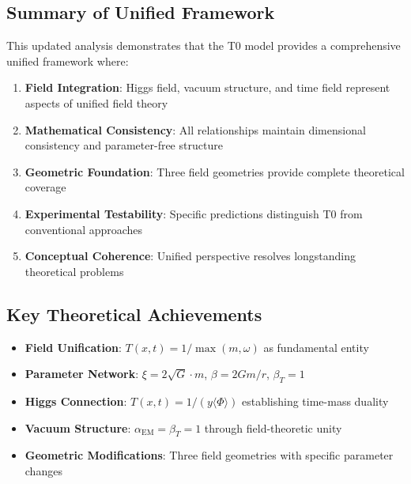 \documentclass[12pt,a4paper]{article}
\newcommand{\Tfieldt}{T(x,t)}
\begin{document}
	\subsection{Summary of Unified Framework}
	\label{subsec:summary}
	
	This updated analysis demonstrates that the T0 model provides a comprehensive unified framework where:
	
	\begin{enumerate}
		\item \textbf{Field Integration}: Higgs field, vacuum structure, and time field represent aspects of unified field theory
		\item \textbf{Mathematical Consistency}: All relationships maintain dimensional consistency and parameter-free structure
		\item \textbf{Geometric Foundation}: Three field geometries provide complete theoretical coverage
		\item \textbf{Experimental Testability}: Specific predictions distinguish T0 from conventional approaches
		\item \textbf{Conceptual Coherence}: Unified perspective resolves longstanding theoretical problems
	\end{enumerate}
	
	\subsection{Key Theoretical Achievements}
	\label{subsec:key_achievements}
	
	\begin{tcolorbox}[colback=green!5!white,colframe=green!75!black,title=T0 Unified Framework: Core Results]
		\begin{itemize}
			\item \textbf{Field Unification}: $\Tfieldt = 1/\max(m, \omega)$ as fundamental entity
			\item \textbf{Parameter Network}: $\xi = 2\sqrt{G} \cdot m$, $\beta = 2Gm/r$, $\beta_T = 1$
			\item \textbf{Higgs Connection}: $\Tfieldt = 1/(y\langle\Phi\rangle)$ establishing time-mass duality
			\item \textbf{Vacuum Structure}: $\alpha_{\text{EM}} = \beta_T = 1$ through field-theoretic unity
			\item \textbf{Geometric Modifications}: Three field geometries with specific parameter changes
		\end{itemize}
	\end{tcolorbox}
	
\end{document}
